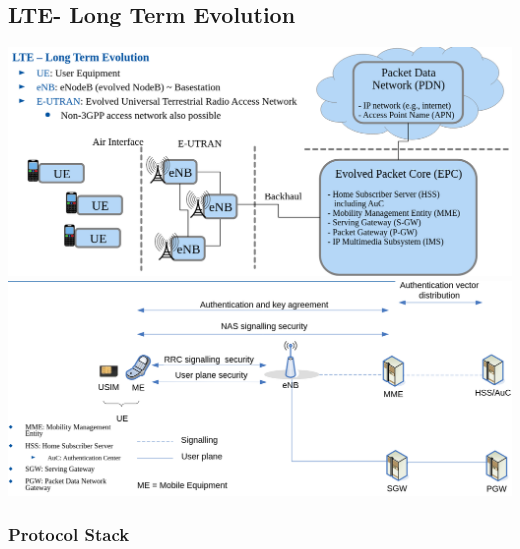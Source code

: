 \subsection{LTE- Long Term Evolution}
\includegraphics[width=1\columnwidth]{Resources/lte.png}
\includegraphics[width=1\columnwidth]{Resources/lte2.png}

\subsubsection{Protocol Stack}
